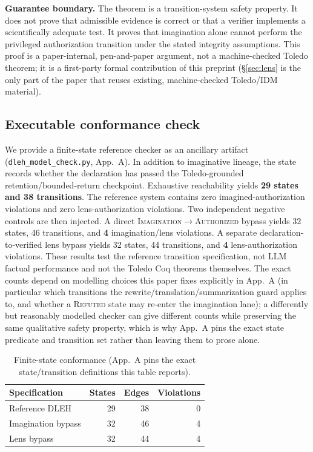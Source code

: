 \documentclass[10pt,twocolumn]{article}
\begin{document}
\begin{corebox}
\textbf{Guarantee boundary.} The theorem is a transition-system safety property. It does not prove that admissible evidence is correct or that a verifier implements a scientifically adequate test. It proves that imagination alone cannot perform the privileged authorization transition under the stated integrity assumptions. This proof is a paper-internal, pen-and-paper argument, not a machine-checked Toledo theorem; it is a first-party formal contribution of this preprint (\S\ref{sec:lens} is the only part of the paper that reuses existing, machine-checked Toledo/IDM material).
\end{corebox}

\subsection{Executable conformance check}
\label{sec:conformance}
We provide a finite-state reference checker as an ancillary artifact (\texttt{dleh\_model\_check.py}, App.~A). In addition to imaginative lineage, the state records whether the declaration has passed the Toledo-grounded retention/bounded-return checkpoint. Exhaustive reachability yields \textbf{29 states and 38 transitions}. The reference system contains zero imagined-authorization violations and zero lens-authorization violations. Two independent negative controls are then injected. A direct \textsc{Imagination}$\to$\textsc{Authorized} bypass yields 32 states, 46 transitions, and \textbf{4} imagination/lens violations. A separate declaration-to-verified lens bypass yields 32 states, 44 transitions, and \textbf{4} lens-authorization violations. These results test the reference transition specification, not LLM factual performance and not the Toledo Coq theorems themselves. The exact counts depend on modelling choices this paper fixes explicitly in App.~A (in particular which transitions the rewrite/translation/summarization guard applies to, and whether a \textsc{Refuted} state may re-enter the imagination lane); a differently but reasonably modelled checker can give different counts while preserving the same qualitative safety property, which is why App.~A pins the exact state predicate and transition set rather than leaving them to prose alone.

\begin{table}[t]
\centering\small
\caption{Finite-state conformance (App.~A pins the exact state/transition definitions this table reports).}
\label{tab:conformance}
\begin{tabular}{@{}lrrr@{}}
\toprule
Specification & States & Edges & Violations\\
\midrule
Reference DLEH & 29 & 38 & 0\\
Imagination bypass & 32 & 46 & 4\\
Lens bypass & 32 & 44 & 4\\
\bottomrule
\end{tabular}
\end{table}
\end{document}
